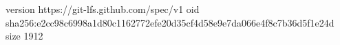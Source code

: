 version https://git-lfs.github.com/spec/v1
oid sha256:e2cc98c6998a1d80c1162772efe20d35cf4d58e9e7da066e4f8c7b36d5f1e24d
size 1912
